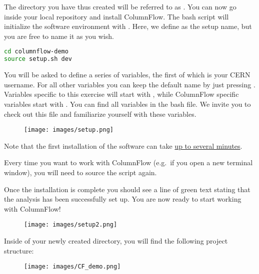 The directory you have thus created will be referred to as . You can now go inside your local repository and install ColumnFlow. The  bash script will initialize the software environment with . Here, we define  as the setup name, but you are free to name it as you wish.

\begin{lstlisting}[language=bash]
cd columnflow-demo
source setup.sh dev
\end{lstlisting}

You will be asked to define a series of variables, the first of which is your CERN username. For all other variables you can keep the default name by just pressing . Variables specific to this exercise will start with , while ColumnFlow specific variables start with . You can find all variables in the  bash file. We invite you to check out this file and familiarize yourself with these variables.

\begin{figure}[!h]
    \centering
    \texttt{[image: images/setup.png]}
\end{figure}

Note that the first installation of the software can take \underline{up to several minutes}. 

Every time you want to work with ColumnFlow (e.g.\ if you open a new terminal window), you will need to source the  script again.

Once the installation is complete you should see a line of green text stating that the analysis has been successfully set up. You are now ready to start working with ColumnFlow! 

\begin{figure}[!h]
    \centering
    \texttt{[image: images/setup2.png]}
\end{figure}

Inside of your newly created  directory, you will find the following project structure:
\begin{figure}[!h]
    \centering
    \texttt{[image: images/CF\_demo.png]}
\end{figure}


